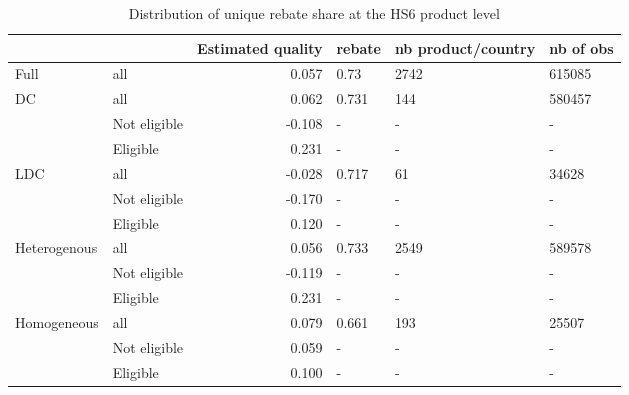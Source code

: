 \documentclass[preview]{standalone}
\begin{document}
\begin{table}[!htbp] \centering
\caption{Distribution of unique rebate share at the HS6 product level}

\begin{adjustbox}{width=\textwidth, totalheight=\baselineskip,keepaspectratio}
\begin{tabular}{llrlll}
\toprule
            &          &  Estimated quality & rebate & nb product/country & nb of obs \\
\midrule
Full & all &              0.057 &   0.73 &               2742 &    615085 \\
DC & all &              0.062 &  0.731 &                144 &    580457 \\
            & Not eligible &             -0.108 &      - &                  - &         - \\
            & Eligible &              0.231 &      - &                  - &         - \\
LDC & all &             -0.028 &  0.717 &                 61 &     34628 \\
            & Not eligible &             -0.170 &      - &                  - &         - \\
            & Eligible &              0.120 &      - &                  - &         - \\
Heterogenous & all &              0.056 &  0.733 &               2549 &    589578 \\
            & Not eligible &             -0.119 &      - &                  - &         - \\
            & Eligible &              0.231 &      - &                  - &         - \\
Homogeneous & all &              0.079 &  0.661 &                193 &     25507 \\
            & Not eligible &              0.059 &      - &                  - &         - \\
            & Eligible &              0.100 &      - &                  - &         - \\
\bottomrule
\end{tabular}

\end{adjustbox}

\begin{tablenotes}
\small
\item


\end{tablenotes}
\end{table}
\end{document}
